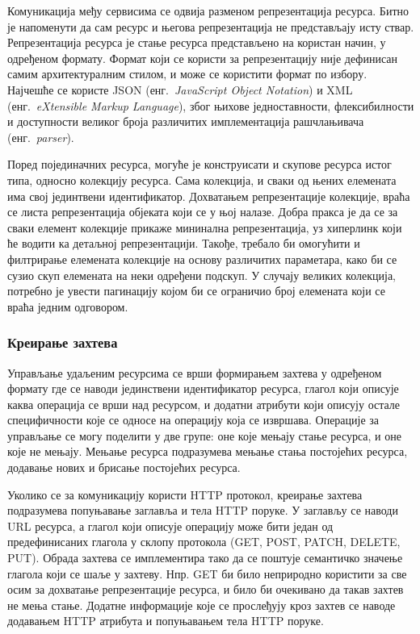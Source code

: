 \documentclass[12pt,oneside]{memoir}
\begin{document}
Комуникација међу сервисима се одвија разменом репрезентација ресурса. Битно је напоменути да сам ресурс и његова репрезентација не представљају исту ствар. Репрезентација ресурса је стање ресурса представљено на користан начин, у одређеном формату. Формат који се користи за репрезентацију није дефинисан самим архитектуралним стилом, и може се користити формат по избору. Најчешће се користе JSON (енг.~\textit{JavaScript Object Notation}) и XML (енг.~\textit{eXtensible Markup Language}), због њихове једноставности, флексибилности и доступности великог броја различитих имплементација рашчлањивача (енг.~\textit{parser}).

Поред појединачних ресурса, могуће је конструисати и скупове ресурса истог типа, односно колекцију ресурса. Сама колекција, и сваки од њених елемената има свој јединтвени идентификатор. Дохватањем репрезентације колекције, враћа се листа репрезентација објеката који се у њој налазе. Добра пракса је да се за сваки елемент колекције прикаже мининална репрезентација, уз хиперлинк који ће водити ка детаљној репрезентацији. Такође, требало би омогућити и филтрирање елемената колекције на основу различитих параметара, како би се сузио скуп елемената на неки одређени подскуп. У случају великих колекција, потребно је увести пагинацију којом би се ограничио број елемената који се враћа једним одговором.   

\subsubsection{Креирање захтева}
Управљање удаљеним ресурсима се врши формирањем захтева у одређеном формату где се наводи јединствени идентификатор ресурса, глагол који описује каква операција се врши над ресурсом, и додатни атрибути који описују остале специфичности које се односе на операцију која се извршава. Операције за управљање се могу поделити у две групе: оне које мењају стање ресурса, и оне које не мењају. Мењање ресурса подразумева мењање стања постојећих ресурса, додавање нових и брисање постојећих ресурса.

Уколико се за комуникацију користи HTTP протокол, креирање захтева подразумева попуњавање заглавља и тела HTTP поруке. У заглављу се наводи URL ресурса, а глагол који описује операцију може бити један од предефинисаних глагола у склопу протокола (GET, POST, PATCH, DELETE, PUT). Обрада захтева се имплементира тако да се поштује семантичко значење глагола који се шаље у захтеву. Нпр. GET би било неприродно користити за све осим за дохватање репрезентације ресурса, и било би очекивано да такав захтев не мења стање. Додатне информације које се прослеђују кроз захтев се наводе додавањем HTTP атрибута и попуњавањем тела HTTP поруке.
\end{document}
